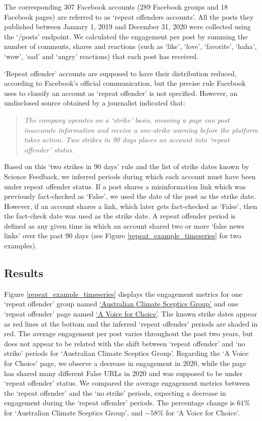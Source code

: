 \documentclass[review]{elsarticle}
\begin{document}
The corresponding 307 Facebook accounts (289 Facebook groups and 18 Facebook pages) are referred to as `repeat offenders accounts'. 
All the posts they published between January 1, 2019 and December 31, 2020 were collected using the `/posts' endpoint. 
We calculated the engagement per post by summing the number of comments, shares and reactions (such as ‘like’, ‘love’, ‘favorite’, ‘haha’, ‘wow’, ‘sad’ and ‘angry’ reactions) that each post has received.

`Repeat offender' accounts are supposed to have their distribution reduced, according to Facebook's official communication, but the precise rule Facebook uses to classify an account as `repeat offender' is not specified. 
However, an undisclosed source obtained by a journalist \cite{2strikes90daysRule} indicated that:
\begin{quote}
\emph{The company operates on a `strike' basis, meaning a page can post inaccurate information and receive a one-strike warning before the platform takes action. 
Two strikes in 90 days places an account into `repeat offender' status.}
\end{quote}


Based on this `two strikes in 90 days' rule and the list of strike dates known by Science Feedback, we inferred periods during which each account must have been under repeat offender status. 
If a post shares a misinformation link which was previously fact-checked as `False', we used the date of the post as the strike date. 
However, if an account shares a link, which later gets fact-checked as `False', then the fact-check date was used as the strike date. 
A repeat offender period is defined as any given time in which an account shared two or more `false news links' over the past 90 days (see Figure \ref{repeat_example_timeseries} for two examples).

\subsection{Results}

Figure \ref{repeat_example_timeseries} displays the engagement metrics for one `repeat offender' group named \href{https://www.facebook.com/groups/108655705888371/}{`Australian Climate Sceptics Group'} and one `repeat offender' page named \href{https://www.facebook.com/avoiceforchoice/}{`A Voice for Choice'}. 
The known strike dates appear as red lines at the bottom and the inferred ‘repeat offender’ periods are shaded in red. 
The average engagement per post varies throughout the past two years, but does not appear to be related with the shift between `repeat offender' and `no strike' periods for `Australian Climate Sceptics Group'.
Regarding the `A Voice for Choice' page, we observe a decrease in engagement in 2020, while the page has shared many different False URLs in 2020 and was supposed to be under `repeat offender' status.
We compared the average engagement metrics between the `repeat offender' and the `no strike' periods, expecting a decrease in engagement during the `repeat offender' periods.
The percentage change is $61\%$ for `Australian Climate Sceptics Group', and $-58\%$ for `A Voice for Choice'.
\end{document}

